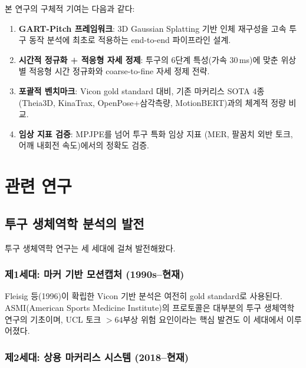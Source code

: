 \documentclass[11pt, a4paper]{report}
\begin{document}
본 연구의 구체적 기여는 다음과 같다:

\begin{enumerate}[leftmargin=*]
  \item \textbf{GART-Pitch 프레임워크}: 3D Gaussian Splatting 기반 인체 재구성을
        고속 투구 동작 분석에 최초로 적용하는 end-to-end 파이프라인 설계.

  \item \textbf{시간적 정규화 + 적응형 자세 정제}: 투구의 6단계 특성(가속 30\,ms)에
        맞춘 위상별 적응형 시간 정규화와 coarse-to-fine 자세 정제 전략.

  \item \textbf{포괄적 벤치마크}: Vicon gold standard 대비, 기존 마커리스 SOTA 4종
        (Theia3D, KinaTrax, OpenPose+삼각측량, MotionBERT)과의 체계적 정량 비교.

  \item \textbf{임상 지표 검증}: MPJPE를 넘어 투구 특화 임상 지표
        (MER, 팔꿈치 외반 토크, 어깨 내회전 속도)에서의 정확도 검증.
\end{enumerate}


\chapter{관련 연구}
\label{ch:related_work}

\section{투구 생체역학 분석의 발전}

투구 생체역학 연구는 세 세대에 걸쳐 발전해왔다.

\subsection{제1세대: 마커 기반 모션캡처 (1990s--현재)}

Fleisig 등(1996)이 확립한 Vicon 기반 분석은 여전히 gold standard로 사용된다.
ASMI(American Sports Medicine Institute)의 프로토콜은 대부분의 투구 생체역학 연구의 기초이며,
UCL 토크 $> 64$ 부상 위험 요인이라는 핵심 발견도 이 세대에서 이루어졌다.

\subsection{제2세대: 상용 마커리스 시스템 (2018--현재)}
\end{document}
